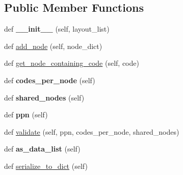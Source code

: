 \subsection*{Public Member Functions}
\begin{DoxyCompactItemize}
\item 
\mbox{\label{classcodar_1_1savanna_1_1node__layout_1_1_node_layout_af898ee59a1a5f520328a53d3b60a62d0}} 
def {\bfseries \+\_\+\+\_\+init\+\_\+\+\_\+} (self, layout\+\_\+list)
\item 
def \hyperlink{classcodar_1_1savanna_1_1node__layout_1_1_node_layout_ab0b94ca4a741efab71db5a598a782c38}{add\+\_\+node} (self, node\+\_\+dict)
\item 
def \hyperlink{classcodar_1_1savanna_1_1node__layout_1_1_node_layout_ae63a2f3c26294b78b35af77af4063899}{get\+\_\+node\+\_\+containing\+\_\+code} (self, code)
\item 
\mbox{\label{classcodar_1_1savanna_1_1node__layout_1_1_node_layout_add6c0879f2b8995f83cf07aaa09b7bbf}} 
def {\bfseries codes\+\_\+per\+\_\+node} (self)
\item 
\mbox{\label{classcodar_1_1savanna_1_1node__layout_1_1_node_layout_a90f88aa1b664e9e9ed2b69e898c4581a}} 
def {\bfseries shared\+\_\+nodes} (self)
\item 
\mbox{\label{classcodar_1_1savanna_1_1node__layout_1_1_node_layout_aa6d5b7f3721c264b0eeb3f7e7351c658}} 
def {\bfseries ppn} (self)
\item 
def \hyperlink{classcodar_1_1savanna_1_1node__layout_1_1_node_layout_a9b1ef6ea6e08f60a04891db7ee460990}{validate} (self, ppn, codes\+\_\+per\+\_\+node, shared\+\_\+nodes)
\item 
\mbox{\label{classcodar_1_1savanna_1_1node__layout_1_1_node_layout_ac75f6e66031d9e5c2f47ac0450335536}} 
def {\bfseries as\+\_\+data\+\_\+list} (self)
\item 
def \hyperlink{classcodar_1_1savanna_1_1node__layout_1_1_node_layout_ae830687f476fdcc4036f141f3caad48b}{serialize\+\_\+to\+\_\+dict} (self)
\item 

\end{DoxyCompactItemize}
